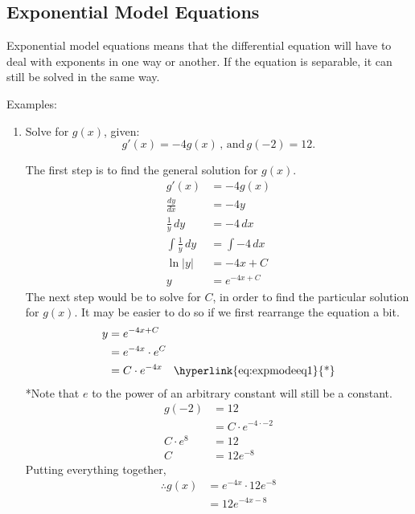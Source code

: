 \documentclass[12pt]{article}
\begin{document}
\subsection{Exponential Model Equations}
Exponential model equations means that the differential equation will have to deal with exponents in one way or another. If the equation is separable, it can still be solved in the same way.

\noindent Examples:
\begin{enumerate}
    \item Solve for $g(x)$, given:
          \[ g'(x) = -4 g(x) \, \text{, and} \, g(-2) = 12. \]

          The first step is to find the general solution for $g(x)$.
          \begin{align*}
              g'(x)                  & = -4 g(x)       \\
              \frac{dy}{dx}          & = -4y           \\[6pt]
              \frac{1}{y} \, dy      & = -4 \, dx      \\[6pt]
              \int \frac{1}{y} \, dy & = \int -4 \, dx \\[6pt]
              \ln|y|                 & = -4x + C       \\
              y                      & = e^{-4x + C}
          \end{align*}
          The next step would be to solve for $C$, in order to find the particular solution for $g(x)$. It may be easier to do so if we first rearrange the equation a bit.
          \begin{align*}
              y & = e^{-4x + C}                                               \\
                & = e^{-4x} \cdot e^C                                         \\
                & = C \cdot e^{-4x} \quad \text{\hyperlink{eq:expmodeeq1}{*}}
          \end{align*}
          \hypertarget{eq:expmodeq1}{*}Note that $e$ to the power of an arbitrary constant will still be a constant.
          \begin{align*}
              g(-2)       & = 12                      \\
                          & = C \cdot e^{-4 \cdot -2} \\
              C \cdot e^8 & = 12                      \\
              C           & = 12 e^{-8}
          \end{align*}
          Putting everything together,
          \begin{align*}
              \therefore g(x) & = e^{-4x} \cdot 12 e^{-8} \\
                              & = 12 e^{-4x-8}
          \end{align*}
          \smallskip


\end{enumerate}
\end{document}
